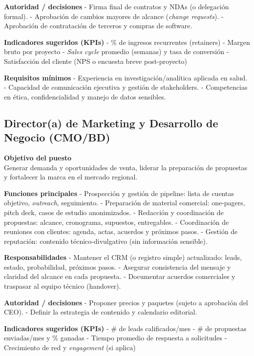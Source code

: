 \documentclass[
  spanish,
]{article}
\begin{document}
\textbf{Autoridad / decisiones} - Firma final de contratos y NDAs (o
delegación formal). - Aprobación de cambios mayores de alcance
(\emph{change requests}). - Aprobación de contratación de terceros y
compras de software.

\textbf{Indicadores sugeridos (KPIs)} - \% de ingresos recurrentes
(retainers) - Margen bruto por proyecto - \emph{Sales cycle} promedio
(semanas) y tasa de conversión - Satisfacción del cliente (NPS o
encuesta breve post-proyecto)

\textbf{Requisitos mínimos} - Experiencia en investigación/analítica
aplicada en salud. - Capacidad de comunicación ejecutiva y gestión de
stakeholders. - Competencias en ética, confidencialidad y manejo de
datos sensibles.

\subsection{Director(a) de Marketing y Desarrollo de Negocio
(CMO/BD)}\label{directora-de-marketing-y-desarrollo-de-negocio-cmobd}

\textbf{Objetivo del puesto}\\
Generar demanda y oportunidades de venta, liderar la preparación de
propuestas y fortalecer la marca en el mercado regional.

\textbf{Funciones principales} - Prospección y gestión de pipeline:
lista de cuentas objetivo, \emph{outreach}, seguimiento. - Preparación
de material comercial: one-pagers, pitch deck, casos de estudio
anonimizados. - Redacción y coordinación de propuestas: alcance,
cronograma, supuestos, entregables. - Coordinación de reuniones con
clientes: agenda, actas, acuerdos y próximos pasos. - Gestión de
reputación: contenido técnico-divulgativo (sin información sensible).

\textbf{Responsabilidades} - Mantener el CRM (o registro simple)
actualizado: leads, estado, probabilidad, próximos pasos. - Asegurar
consistencia del mensaje y claridad del alcance en cada propuesta. -
Documentar acuerdos comerciales y traspasar al equipo técnico
(handover).

\textbf{Autoridad / decisiones} - Proponer precios y paquetes (sujeto a
aprobación del CEO). - Definir la estrategia de contenido y calendario
editorial.

\textbf{Indicadores sugeridos (KPIs)} - \# de leads calificados/mes - \#
de propuestas enviadas/mes y \% ganadas - Tiempo promedio de respuesta a
solicitudes - Crecimiento de red y \emph{engagement} (si aplica)
\end{document}
